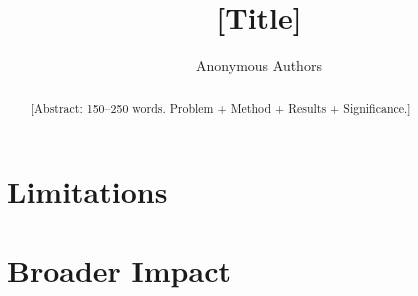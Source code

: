 \documentclass{article}
\title{[Title]}
\author{%
  Anonymous Authors \\
}
\begin{document}
\maketitle

\begin{abstract}
  [Abstract: 150–250 words. Problem + Method + Results + Significance.]
\end{abstract}








\section*{Limitations}


\section*{Broader Impact}





\newpage
\appendix

\end{document}
